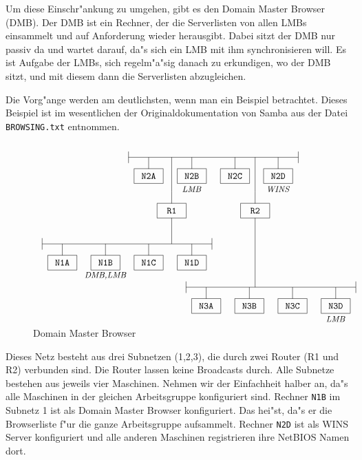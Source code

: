 \documentclass{scrartcl}\usepackage{pslatex}\typearea{12}
\newcommand{\dateistyle}{\texttt}
\newcommand{\nbname}{\texttt}
\begin{document}
Um diese Einschr"ankung zu umgehen, gibt es den Domain Master Browser
(DMB). Der DMB ist ein Rechner, der die Serverlisten von allen LMBs
einsammelt und auf Anforderung wieder herausgibt. Dabei sitzt der DMB
nur passiv da und wartet darauf, da"s sich ein LMB mit ihm
synchronisieren will. Es ist Aufgabe der LMBs, sich regelm"a"sig
danach zu erkundigen, wo der DMB sitzt, und mit diesem dann die
Serverlisten abzugleichen.

Die Vorg"ange werden am deutlichsten, wenn man ein Beispiel
betrachtet. Dieses Beispiel ist im wesentlichen der
Originaldokumentation von Samba aus der Datei \dateistyle{BROWSING.txt}
entnommen.

\newcommand{\minicomputer}[1]{%
\begin{picture}(10,9)(5,9)
\put(0,0){\framebox(10,5){{\ttfamily #1}}}
\put(5,5){\line(0,1){4}}
\end{picture}}
\newcommand{\mininetz}[1]{%
\begin{picture}(62,12)
\put(10,10){\minicomputer{N#1A}}
\put(25,10){\minicomputer{N#1B}}
\put(40,10){\minicomputer{N#1C}}
\put(55,10){\minicomputer{N#1D}}
\put(3,10){\line(1,0){59}}
\put(3,8){\line(0,1){4}}
\put(62,8){\line(0,1){4}}
\end{picture}}

\begin{figure}[ht]
\[\setlength{\unitlength}{1.1mm}
\begin{picture}(120,60)(0,5)
\put(0,20){\mininetz{1}}
\put(25,19){\makebox(0,0){\textit{{\small DMB,LMB}}}}
\put(30,50){\mininetz{2}}
\put(85,49){\makebox(0,0){\textit{{\small WINS}}}}
\put(55,49){\makebox(0,0){\textit{{\small LMB}}}}
\put(50,5){\mininetz{3}}
\put(105,4){\makebox(0,0){\textit{{\small LMB}}}}
\put(48,48){\minicomputer{R1}}
\put(48,48){\line(0,1){12}}
\put(48,39){\line(0,-1){9}}
\put(77,48){\minicomputer{R2}}
\put(77,48){\line(0,1){12}}
\put(77,39){\line(0,-1){24}}
\end{picture}\]
\caption{Domain Master Browser}
\end{figure}

Dieses Netz besteht aus drei Subnetzen (1,2,3), die durch zwei Router (R1
und R2) verbunden sind. Die Router lassen keine Broadcasts durch. Alle
Subnetze bestehen aus jeweils vier Maschinen.  Nehmen wir der Einfachheit
halber an, da"s alle Maschinen in der gleichen Arbeitsgruppe
konfiguriert sind. Rechner \nbname{N1B} im Subnetz 1 ist als Domain
Master Browser konfiguriert. Das hei"st, da"s er die Browserliste f"ur
die ganze Arbeitsgruppe aufsammelt. Rechner \nbname{N2D} ist als WINS
Server konfiguriert und alle anderen Maschinen registrieren ihre
NetBIOS Namen dort.
\end{document}
